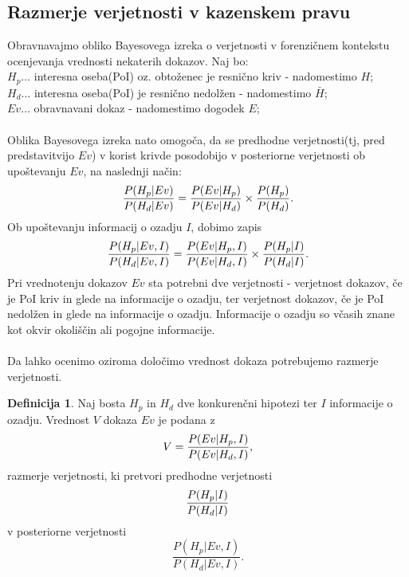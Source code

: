 \documentclass[12pt,a4paper]{amsart}
\theoremstyle{definition} %
\newtheorem{definicija}{Definicija}[section]
\theoremstyle{plain} %
\begin{document}
\subsection{Razmerje verjetnosti v kazenskem pravu}
Obravnavajmo obliko Bayesovega izreka o verjetnosti v forenzičnem kontekstu ocenjevanja vrednosti nekaterih dokazov. Naj bo:\\
$H_p \dots$ interesna oseba(PoI) oz. obtoženec je resnično kriv - nadomestimo $H$;\\
$H_d \dots$ interesna oseba(PoI) je resnično nedolžen - nadomestimo $\bar{H}$;\\
$Ev \dots$ obravnavani dokaz - nadomestimo dogodek $E$;\\\\
Oblika Bayesovega izreka nato omogoča, da se predhodne verjetnosti(tj, pred predstavitvijo $Ev$) v korist krivde posodobijo v posteriorne
verjetnosti ob upoštevanju $Ev$, na naslednji način:
\[
   \frac{P(H_p \lvert Ev)}{P(H_d \lvert Ev)} = \frac{P(Ev \lvert H_p)}{P(Ev \lvert H_d)} \times \frac{P(H_p)}{P(H_d)}. \vspace{2mm}
\]
Ob upoštevanju informacij o ozadju $I$, dobimo zapis
\[
   \frac{P(H_p \lvert Ev, I)}{P(H_d \lvert Ev, I)} = \frac{P(Ev \lvert H_p, I)}{P(Ev \lvert H_d, I)} \times \frac{P(H_p \lvert I)}{P(H_d \lvert I)}. \vspace{2mm}
\]
Pri vrednotenju dokazov $Ev$ sta potrebni dve verjetnosti - verjetnost dokazov, če je PoI kriv in glede na informacije o ozadju, ter
verjetnost dokazov, če je PoI nedolžen in glede na informacije o ozadju. Informacije o ozadju so včasih znane kot okvir okoliščin
ali pogojne informacije. \\\\
Da lahko ocenimo oziroma določimo vrednost dokaza potrebujemo razmerje verjetnosti.
\begin{definicija}
   Naj bosta  $H_p$ in $H_d$ dve konkurenčni hipotezi ter $I$ informacije o ozadju. Vrednost $V$ dokaza $Ev$ je podana z
   \[
       V = \frac{P(Ev \lvert H_p, I)}{P(Ev \lvert H_d, I)}, \vspace{2mm}
   \]
   razmerje verjetnosti, ki pretvori predhodne verjetnosti
   \[
       \frac{P(H_p \lvert I)}{P(H_d \lvert I)} \vspace{2mm}
   \]
   v posteriorne verjetnosti
   \[
       \frac{P(H_p \lvert Ev, I)}{P(H_d \lvert Ev, I)}.
   \]
\end{definicija}
\end{document}
